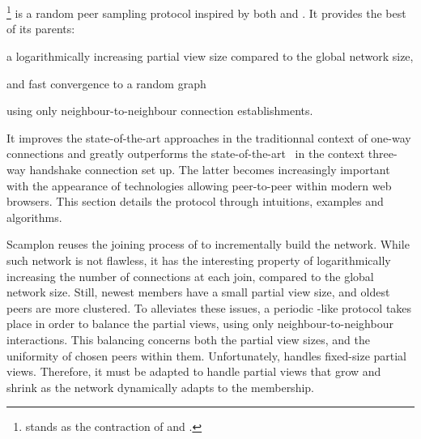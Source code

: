 
\section{\SCAMPLON{}}
\label{sec:proposal}

\SCAMPLON{}\footnote{\SCAMPLON{} stands as the contraction of \SCAMP{} and
  \CYCLON{}.} is a random peer sampling protocol inspired by both \SCAMP{} and
\CYCLON{}. It provides the best of its parents: 
\begin{inparaenum}[(i)]
\item a logarithmically increasing partial view size compared to the global
  network size,
\item and fast convergence to a random graph
\item using only neighbour-to-neighbour connection establishments.
\end{inparaenum}
It improves the state-of-the-art approaches in the traditionnal context of
one-way connections and greatly outperforms the
state-of-the-art~\cite{ganesh2001scamp,voulgaris2005cyclon} in the context
three-way handshake connection set up.  The latter becomes increasingly
important with the appearance of technologies allowing peer-to-peer within
modern web browsers. This section details the \SCAMPLON{} protocol through
intuitions, examples and algorithms.

\begin{asparadesc}
\item [Scamplon] reuses the joining process of \SCAMP{} to incrementally build
  the network. While such network is not flawless, it has the interesting
  property of logarithmically increasing the number of connections at each
  join, compared to the global network size. Still, newest members have a small
  partial view size, and oldest peers are more clustered. To alleviates these
  issues, a periodic \CYCLON{}-like protocol takes place in order to balance
  the partial views, using only neighbour-to-neighbour interactions. This
  balancing concerns both the partial view sizes, and the uniformity of chosen
  peers within them. Unfortunately, \CYCLON{} handles fixed-size partial
  views. Therefore, it must be adapted to handle partial views that grow and
  shrink as the network dynamically adapts to the membership.
\end{asparadesc}

